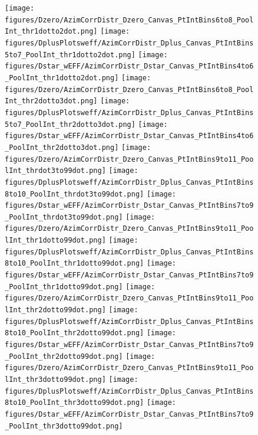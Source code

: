 \begin{figure}[!htbp]
\centering
{\texttt{[image: figures/Dzero/AzimCorrDistr\_Dzero\_Canvas\_PtIntBins6to8\_PoolInt\_thr1dotto2dot.png]}} 
{\texttt{[image: figures/DplusPlotsweff/AzimCorrDistr\_Dplus\_Canvas\_PtIntBins5to7\_PoolInt\_thr1dotto2dot.png]}} 
{\texttt{[image: figures/Dstar\_wEFF/AzimCorrDistr\_Dstar\_Canvas\_PtIntBins4to6\_PoolInt\_thr1dotto2dot.png]}}
{\texttt{[image: figures/Dzero/AzimCorrDistr\_Dzero\_Canvas\_PtIntBins6to8\_PoolInt\_thr2dotto3dot.png]}} 
{\texttt{[image: figures/DplusPlotsweff/AzimCorrDistr\_Dplus\_Canvas\_PtIntBins5to7\_PoolInt\_thr2dotto3dot.png]}} 
{\texttt{[image: figures/Dstar\_wEFF/AzimCorrDistr\_Dstar\_Canvas\_PtIntBins4to6\_PoolInt\_thr2dotto3dot.png]}}
{\texttt{[image: figures/Dzero/AzimCorrDistr\_Dzero\_Canvas\_PtIntBins9to11\_PoolInt\_thrdot3to99dot.png]}} 
{\texttt{[image: figures/DplusPlotsweff/AzimCorrDistr\_Dplus\_Canvas\_PtIntBins8to10\_PoolInt\_thrdot3to99dot.png]}} 
{\texttt{[image: figures/Dstar\_wEFF/AzimCorrDistr\_Dstar\_Canvas\_PtIntBins7to9\_PoolInt\_thrdot3to99dot.png]}} 
{\texttt{[image: figures/Dzero/AzimCorrDistr\_Dzero\_Canvas\_PtIntBins9to11\_PoolInt\_thr1dotto99dot.png]}} 
{\texttt{[image: figures/DplusPlotsweff/AzimCorrDistr\_Dplus\_Canvas\_PtIntBins8to10\_PoolInt\_thr1dotto99dot.png]}} 
{\texttt{[image: figures/Dstar\_wEFF/AzimCorrDistr\_Dstar\_Canvas\_PtIntBins7to9\_PoolInt\_thr1dotto99dot.png]}}
{\texttt{[image: figures/Dzero/AzimCorrDistr\_Dzero\_Canvas\_PtIntBins9to11\_PoolInt\_thr2dotto99dot.png]}} 
{\texttt{[image: figures/DplusPlotsweff/AzimCorrDistr\_Dplus\_Canvas\_PtIntBins8to10\_PoolInt\_thr2dotto99dot.png]}} 
{\texttt{[image: figures/Dstar\_wEFF/AzimCorrDistr\_Dstar\_Canvas\_PtIntBins7to9\_PoolInt\_thr2dotto99dot.png]}}
{\texttt{[image: figures/Dzero/AzimCorrDistr\_Dzero\_Canvas\_PtIntBins9to11\_PoolInt\_thr3dotto99dot.png]}} 
{\texttt{[image: figures/DplusPlotsweff/AzimCorrDistr\_Dplus\_Canvas\_PtIntBins8to10\_PoolInt\_thr3dotto99dot.png]}} 
{\texttt{[image: figures/Dstar\_wEFF/AzimCorrDistr\_Dstar\_Canvas\_PtIntBins7to9\_PoolInt\_thr3dotto99dot.png]}}
\end{figure}
